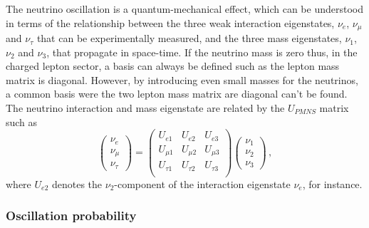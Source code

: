 The neutrino oscillation is a quantum-mechanical effect, which can be understood in terms of the relationship between the three weak interaction eigenstates, $\nu_e$, $\nu_{\mu}$ and $\nu_{\tau}$ that can be experimentally measured, and the three mass eigenstates, $\nu_1$, $\nu_2$ and $\nu_3$, that propagate in space-time.
If the neutrino mass is zero thus, in the charged lepton sector, a basis can always be defined such as the lepton mass matrix is diagonal.
However, by introducing even small masses for the neutrinos, a common basis were the two lepton mass matrix are diagonal can't be found.
The neutrino interaction and mass eigenstate are related by the $U_{PMNS}$ matrix such as
\begin{equation}
  \begin{pmatrix}
    \nu_e \\
    \nu_{\mu} \\
    \nu_{\tau}
  \end{pmatrix}
  =
  \begin{pmatrix}
    U_{e1} & U_{e2} & U_{e3} \\
    U_{\mu 1} & U_{\mu 2} & U_{\mu 3} \\
    U_{\tau 1} &  U_{\tau 2} &  U_{\tau 3} \\
  \end{pmatrix}
  \begin{pmatrix}
    \nu_1 \\
    \nu_2 \\
    \nu_3
  \end{pmatrix}
  \,,
  \label{eq:upmns}
\end{equation}
where $U_{e2}$ denotes the $\nu_2$-component of the interaction eigenstate $\nu_e$, for instance.

\subsubsection*{Oscillation probability}

